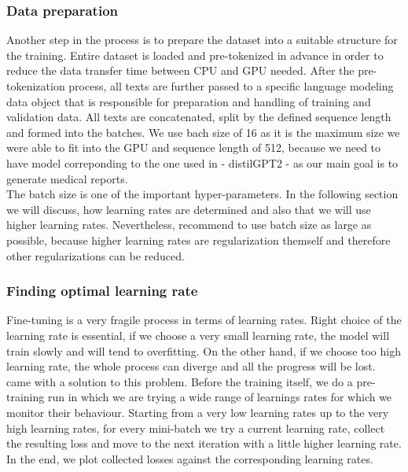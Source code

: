 \subsubsection*{Data preparation}
Another step in the process is to prepare the dataset into a suitable structure for the training. Entire dataset is loaded and pre-tokenized in advance in order to reduce the data transfer time between CPU and GPU needed. After the pre-tokenization process, all texts are further passed to a specific language modeling data object that is responsible for preparation and handling of training and validation data. All texts are concatenated, split by the defined sequence length and formed into the batches. We use bach size of 16 as it is the maximum size we were able to fit into the GPU and sequence length of 512, because we need to have model correponding to the one used in \citet{alfarghaly2021automated} - distilGPT2 - as our main goal is to generate medical reports.\\

The batch size is one of the important hyper-parameters. In the following section we will discuss, how learning rates are determined and also that we will use higher learning rates. Nevertheless, \citet{smith2018disciplined} recommend to use batch size as large as possible, because higher learning rates are regularization themself and therefore other regularizations can be reduced.

\subsubsection*{Finding optimal learning rate}
Fine-tuning is a very fragile process in terms of learning rates. Right choice of the learning rate is essential, if we choose a very small learning rate, the model will train slowly and will tend to overfitting. On the other hand, if we choose too high learning rate, the whole process can diverge and all the progress will be lost.\\

\citet{smith2017cyclical} came with a solution to this problem. Before the training itself, we do a pre-training run in which we are trying a wide range of learnings rates for which we monitor their behaviour. Starting from a very low learning rates up to the very high learning rates, for every mini-batch we try a current learning rate, collect the resulting loss and move to the next iteration with a little higher learning rate. In the end, we plot collected losses against the corresponding learning rates.\\

